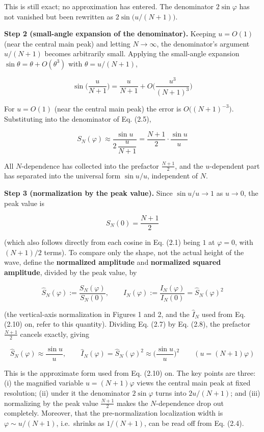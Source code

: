 \documentclass[
]{ltjsarticle}
\begin{document}
This is still exact; no approximation has entered. The denominator
\(2\sin\varphi\) has not vanished but been rewritten as
\(2\sin\!\big(u/(N+1)\big)\).

\textbf{Step 2 (small-angle expansion of the denominator).} Keeping
\(u=O(1)\) (near the central main peak) and letting \(N\to\infty\), the
denominator's argument \(u/(N+1)\) becomes arbitrarily small. Applying
the small-angle expansion \(\sin\theta=\theta+O(\theta^3)\) with
\(\theta=u/(N+1)\),

\[
\sin\!\Big(\frac{u}{N+1}\Big)=\frac{u}{N+1}+O\!\Big(\frac{u^3}{(N+1)^3}\Big)
\tag{2.6}
\]

For \(u=O(1)\) (near the central main peak) the error is
\(O\!\big((N+1)^{-3}\big)\). Substituting into the denominator of Eq.
(2.5),

\[
S_N(\varphi)\approx\frac{\sin u}{2\,\dfrac{u}{N+1}}
=\frac{N+1}{2}\cdot\frac{\sin u}{u}
\tag{2.7}
\]

All \(N\)-dependence has collected into the prefactor
\(\tfrac{N+1}{2}\), and the \(u\)-dependent part has separated into the
universal form \(\sin u/u\), independent of \(N\).

\textbf{Step 3 (normalization by the peak value).} Since
\(\sin u/u\to1\) as \(u\to0\), the peak value is

\[
S_N(0)=\frac{N+1}{2}
\tag{2.8}
\]

(which also follows directly from each cosine in Eq. (2.1) being \(1\)
at \(\varphi=0\), with \((N+1)/2\) terms). To compare only the shape,
not the actual height of the wave, define the \textbf{normalized
amplitude} and \textbf{normalized squared amplitude}, divided by the
peak value, by

\[
\widehat{S}_N(\varphi):=\frac{S_N(\varphi)}{S_N(0)},
\qquad
\widehat{I}_N(\varphi):=\frac{I_N(\varphi)}{I_N(0)}=\widehat{S}_N(\varphi)^2
\]

(the vertical-axis normalization in Figures 1 and 2, and the
\(\widehat{I}_N\) used from Eq. (2.10) on, refer to this quantity).
Dividing Eq. (2.7) by Eq. (2.8), the prefactor \(\tfrac{N+1}{2}\)
cancels exactly, giving

\[
\widehat{S}_N(\varphi)\approx\frac{\sin u}{u},
\qquad
\widehat{I}_N(\varphi)=\widehat{S}_N(\varphi)^2\approx\Big(\frac{\sin u}{u}\Big)^2
\qquad(u=(N+1)\varphi)
\tag{2.9}
\]

This is the approximate form used from Eq. (2.10) on. The key points are
three: (i) the magnified variable \(u=(N+1)\varphi\) views the central
main peak at fixed resolution; (ii) under it the denominator
\(2\sin\varphi\) turns into \(2u/(N+1)\); and (iii) normalizing by the
peak value \(\tfrac{N+1}{2}\) makes the \(N\)-dependence drop out
completely. Moreover, that the pre-normalization localization width is
\(\varphi\sim u/(N+1)\), i.e.~shrinks as \(1/(N+1)\), can be read off
from Eq. (2.4).
\end{document}
